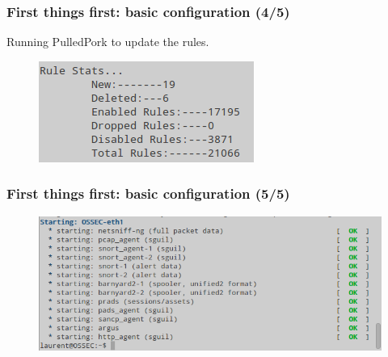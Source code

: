 \documentclass{beamer}
\begin{document}
\begin{frame}
\frametitle{First things first: basic configuration (4/5)}
Running PulledPork to update the rules.
\begin{figure}
   \includegraphics[width= 0.5\linewidth]{../images/VM_PulledPort_rules.png}
\end{figure}
\end{frame}
\begin{frame}
\frametitle{First things first: basic configuration (5/5)}
\begin{figure}
   \includegraphics[width= 0.9\linewidth]{../images/VM_OK.png}
\end{figure}
\end{frame}

\end{document}
